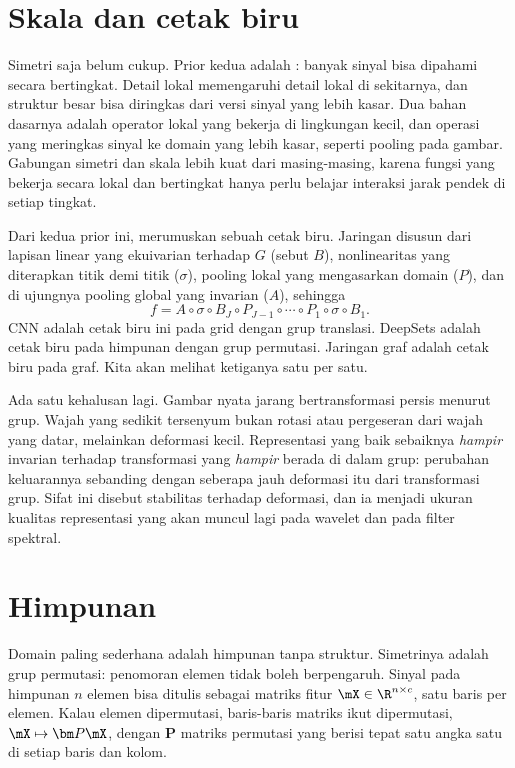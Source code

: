 \section{Skala dan cetak biru}

Simetri saja belum cukup. Prior kedua adalah : banyak sinyal bisa
dipahami secara bertingkat. Detail lokal memengaruhi detail lokal di sekitarnya, dan struktur
besar bisa diringkas dari versi sinyal yang lebih kasar. Dua bahan dasarnya adalah operator lokal
yang bekerja di lingkungan kecil, dan operasi  yang meringkas sinyal ke
domain yang lebih kasar, seperti pooling pada gambar. Gabungan simetri dan skala lebih kuat dari
masing-masing, karena fungsi yang bekerja secara lokal dan bertingkat hanya perlu belajar
interaksi jarak pendek di setiap tingkat.

Dari kedua prior ini, \citet{bronstein2021} merumuskan sebuah cetak biru. Jaringan disusun dari
lapisan linear yang ekuivarian terhadap $G$ (sebut $B$), nonlinearitas yang diterapkan titik demi
titik ($\sigma$), pooling lokal yang mengasarkan domain ($P$), dan di ujungnya pooling global yang
invarian ($A$), sehingga
\begin{equation}
f=A\circ\sigma\circ B_J\circ P_{J-1}\circ\cdots\circ P_1\circ\sigma\circ B_1.
\end{equation}
CNN adalah cetak biru ini pada grid dengan grup translasi. DeepSets adalah cetak biru pada
himpunan dengan grup permutasi. Jaringan graf adalah cetak biru pada graf. Kita akan melihat
ketiganya satu per satu.

Ada satu kehalusan lagi. Gambar nyata jarang bertransformasi persis menurut grup. Wajah yang
sedikit tersenyum bukan rotasi atau pergeseran dari wajah yang datar, melainkan deformasi kecil.
Representasi yang baik sebaiknya \emph{hampir} invarian terhadap transformasi yang \emph{hampir}
berada di dalam grup: perubahan keluarannya sebanding dengan seberapa jauh deformasi itu dari
transformasi grup. Sifat ini disebut stabilitas terhadap deformasi, dan ia menjadi ukuran kualitas
representasi yang akan muncul lagi pada wavelet dan pada filter spektral.

\section{Himpunan}

Domain paling sederhana adalah himpunan tanpa struktur. Simetrinya adalah grup permutasi: penomoran
elemen tidak boleh berpengaruh. Sinyal pada himpunan $n$ elemen bisa ditulis sebagai matriks fitur
$\mX\in\R^{n\times c}$, satu baris per elemen. Kalau elemen dipermutasi, baris-baris matriks ikut
dipermutasi, $\mX\mapsto\bm P\mX$, dengan $\bm P$ matriks permutasi yang berisi tepat satu angka
satu di setiap baris dan kolom.

